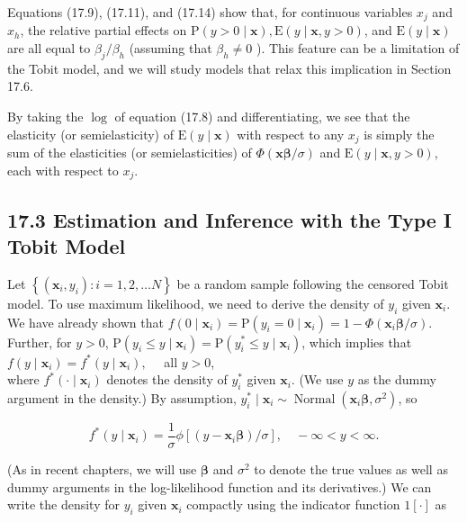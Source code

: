\documentclass[10pt]{article}
\begin{document}
Equations (17.9), (17.11), and (17.14) show that, for continuous variables $x_{j}$ and $x_{h}$, the relative partial effects on $\mathrm{P}(y>0 \mid \mathbf{x}), \mathrm{E}(y \mid \mathbf{x}, y>0)$, and $\mathrm{E}(y \mid \mathbf{x})$ are all equal to $\beta_{j} / \beta_{h}$ (assuming that $\beta_{h} \neq 0$ ). This feature can be a limitation of the Tobit model, and we will study models that relax this implication in Section 17.6.

By taking the $\log$ of equation (17.8) and differentiating, we see that the elasticity (or semielasticity) of $\mathrm{E}(y \mid \mathbf{x})$ with respect to any $x_{j}$ is simply the sum of the elasticities (or semielasticities) of $\Phi(\mathbf{x} \boldsymbol{\beta} / \sigma)$ and $\mathrm{E}(y \mid \mathbf{x}, y>0)$, each with respect to $x_{j}$.

\subsection*{17.3 Estimation and Inference with the Type I Tobit Model}
Let $\left\{\left(\mathbf{x}_{i}, y_{i}\right): i=1,2, \ldots N\right\}$ be a random sample following the censored Tobit model. To use maximum likelihood, we need to derive the density of $y_{i}$ given $\mathbf{x}_{i}$. We have already shown that $f\left(0 \mid \mathbf{x}_{i}\right)=\mathrm{P}\left(y_{i}=0 \mid \mathbf{x}_{i}\right)=1-\Phi\left(\mathbf{x}_{i} \boldsymbol{\beta} / \sigma\right)$. Further, for $y>0$, $\mathrm{P}\left(y_{i} \leq y \mid \mathbf{x}_{i}\right)=\mathrm{P}\left(y_{i}^{*} \leq y \mid \mathbf{x}_{i}\right)$, which implies that\\
$f\left(y \mid \mathbf{x}_{i}\right)=f^{*}\left(y \mid \mathbf{x}_{i}\right), \quad$ all $y>0$,\\
where $f^{*}\left(\cdot \mid \mathbf{x}_{i}\right)$ denotes the density of $y_{i}^{*}$ given $\mathbf{x}_{i}$. (We use $y$ as the dummy argument in the density.) By assumption, $y_{i}^{*} \mid \mathbf{x}_{i} \sim \operatorname{Normal}\left(\mathbf{x}_{i} \boldsymbol{\beta}, \sigma^{2}\right)$, so

$$
f^{*}\left(y \mid \mathbf{x}_{i}\right)=\frac{1}{\sigma} \phi\left[\left(y-\mathbf{x}_{i} \boldsymbol{\beta}\right) / \sigma\right], \quad-\infty<y<\infty .
$$

(As in recent chapters, we will use $\boldsymbol{\beta}$ and $\sigma^{2}$ to denote the true values as well as dummy arguments in the log-likelihood function and its derivatives.) We can write the density for $y_{i}$ given $\mathbf{x}_{i}$ compactly using the indicator function $1[\cdot]$ as
\end{document}
